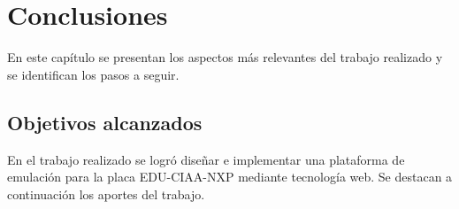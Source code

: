 
\chapter{Conclusiones} %

\label{Chapter5} %

En este capítulo se presentan los aspectos más relevantes del trabajo realizado y
se identifican los pasos a seguir.



\section{Objetivos alcanzados}

En el trabajo realizado se logró diseñar e implementar una plataforma de emulación para la placa EDU-CIAA-NXP mediante tecnología web. Se destacan a continuación los aportes del
trabajo.

